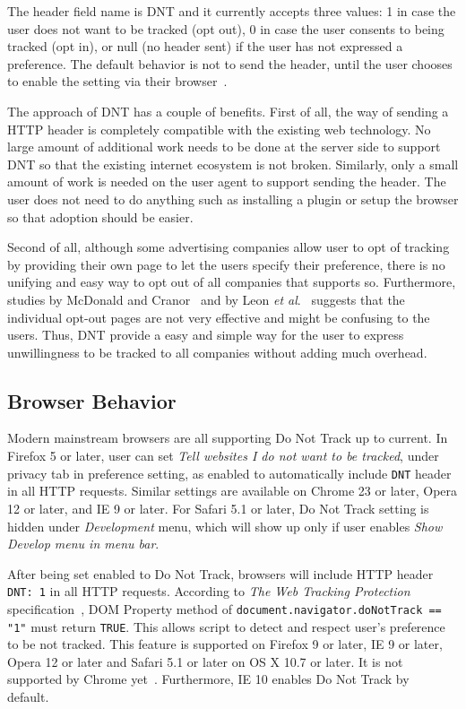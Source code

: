 \documentclass{sig-alternate}
\begin{document}
The header field name is DNT and it currently accepts three values: 1 in case the user does not want to be tracked (opt out), 0 in case the user consents to being tracked (opt in), or null (no header sent) if the user has not expressed a preference. The default behavior is not to send the header, until the user chooses to enable the setting via their browser~\cite{wikidnt}. 

The approach of DNT has a couple of benefits. First of all, the way of sending a HTTP header is completely compatible with the existing web technology. No large amount of additional work needs to be done at the server side to support DNT so that the existing internet ecosystem is not broken. Similarly, only a small amount of work is needed on the user agent to support sending the header. The user does not need to do anything such as installing a plugin or setup the browser so that adoption should be easier.

Second of all, although some advertising companies allow user to opt of tracking by providing their own page to let the users specify their preference, there is no unifying and easy way to opt out of all companies that supports so. Furthermore, studies by McDonald and Cranor~\cite{mcdonald2010beliefs} and by Leon \emph{et al}.~\cite{leon2012johnny} suggests that the individual opt-out pages are not very effective and might be confusing to the users. Thus, DNT provide a easy and simple way for the user to express unwillingness to be tracked to all companies without adding much overhead.

\subsection*{Browser Behavior} \label{sec:browserbehavior}

Modern mainstream browsers are all supporting Do Not Track up to current. In Firefox 5 or later, user can set \emph{Tell websites I do not want to be tracked}, under privacy tab in preference setting, as enabled to automatically include \texttt{DNT} header in all HTTP requests. Similar settings are available on Chrome 23 or later, Opera 12 or later, and IE 9 or later. For Safari 5.1 or later, Do Not Track setting is hidden under \emph{Development} menu, which will show up only if user enables \emph{Show Develop menu in menu bar}.

After being set enabled to Do Not Track, browsers will include HTTP header \verb|DNT: 1| in all HTTP requests. According to \emph{The Web Tracking Protection} specification~\cite{w3cwtp}, DOM Property method of \verb|document.navigator.doNotTrack == "1"| must return \verb|TRUE|. This allows script to detect and respect user's preference to be not tracked. This feature is supported on Firefox 9 or later, IE 9 or later, Opera 12 or later and Safari 5.1 or later on OS X 10.7 or later. It is not supported by Chrome yet~\cite{navigatordnt}. Furthermore, IE 10 enables Do Not Track by default.~\cite{wikidnt}
\end{document}
